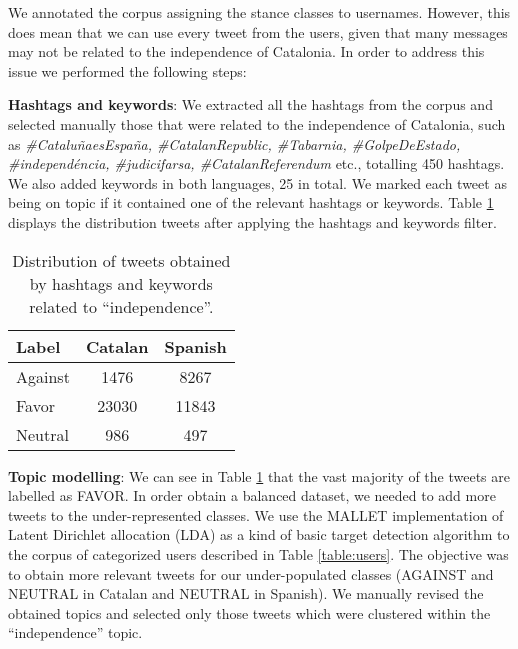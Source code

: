 \documentclass[10pt, a4paper]{article}
\begin{document}
We annotated the corpus assigning the stance classes to usernames. However, this does mean that we can use every tweet from the users, given that many messages may not be related to the independence of Catalonia. In order to address this issue we performed the following steps:

\textbf{Hashtags and keywords}: We extracted all the hashtags from the corpus and selected manually those that were related to the independence of Catalonia, such as \textit{\#Catalu\~naesEspa\~na, \#CatalanRepublic, \#Tabarnia, \#GolpeDeEstado, \#independ\'encia, \#judicifarsa, \#CatalanReferendum} etc., totalling 450 hashtags. We also added keywords in both languages, 25 in total. We marked each tweet as being on topic if it contained one of the relevant hashtags or keywords. Table \ref{tab:relevanttweets} displays the distribution tweets after applying the hashtags and keywords filter.

\begin{table}[!ht]
\centering
\begin{tabular}{lcc} \hline
Label & Catalan & Spanish\\ \hline
 Against & 1476 & 8267 \\
Favor & 23030 & 11843 \\
Neutral & 986 & 497 \\ \hline
\end{tabular}
\caption{Distribution of tweets obtained by hashtags and keywords related to ``independence''.}\label{tab:relevanttweets}
\end{table}

\textbf{Topic modelling}: We can see in Table \ref{tab:relevanttweets} that the vast majority of the tweets are labelled as FAVOR. In order obtain a balanced dataset, we needed to add more tweets to the under-represented classes. We use the MALLET \cite{McCallumMALLET} implementation of Latent Dirichlet allocation (LDA) \cite{Blei:2003:LDA:944919.944937} as a kind of basic target detection algorithm to the corpus of categorized users described in Table \ref{table:users}. The objective was to obtain more relevant tweets for our under-populated classes (AGAINST and NEUTRAL in Catalan and NEUTRAL in Spanish). We manually revised the obtained topics and selected only those tweets which were clustered within the ``independence'' topic.

\end{document}
